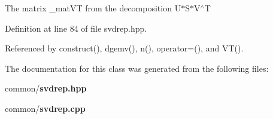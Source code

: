 The matrix \_\-mat\-VT from the decomposition U$\ast$S$\ast$V$^\wedge$T 

Definition at line 84 of file svdrep.hpp.

Referenced by construct(), dgemv(), n(), operator=(), and VT().

The documentation for this class was generated from the following files:\begin{CompactItemize}
\item 
common/{\bf svdrep.hpp}\item 
common/{\bf svdrep.cpp}\end{CompactItemize}
